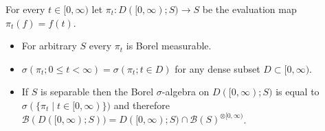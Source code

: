 \begin{lem}\label{SkorohodInfiniteBorelGeneratedByProjections}For every $t \in [0,\infty)$ let $\pi_t : D([0,\infty); S) \to
  S$ be the evaluation map $\pi_t(f) = f(t)$.  
\begin{itemize}
\item[(i)] For arbitrary $S$ every $\pi_t$ is Borel measurable.  
\item[(ii)] $\sigma(\pi_t ; 0 \leq t < \infty) = \sigma(\pi_t ; t \in D)$ for any dense subset $D \subset [0,\infty)$.
\item[(iii)]If $S$ is separable then the Borel $\sigma$-algebra on $D([0,\infty); S)$ is
  equal to $\sigma(\lbrace \pi_t \mid t \in [0,\infty) \rbrace)$ and
  therefore $\mathcal{B}(D([0,\infty); S)) = D([0,\infty);
  S) \cap \mathcal{B}(S)^{\otimes [0,\infty)}$.
\end{itemize}
\end{lem}
